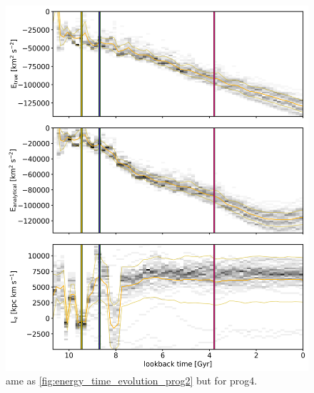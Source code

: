\begin{figure}[htbp]
\captionsetup{format=plain}
    \centering
	\includegraphics[width=\textwidth]{plots/Dynamics/prog4/energy_time_evolution_hist_mean.png}
    \caption{ame as \ref{fig:energy_time_evolution_prog2} but for prog4.}\label{fig:energy_time_evolution_prog4}
\end{figure}

